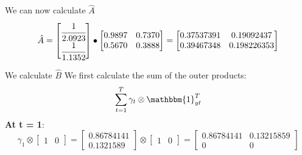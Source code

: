 We can now calculate $\hat{A}$
\[
\hat{A} = \begin{bmatrix}
    \cfrac{1}{2.0923} \\ \cfrac{1}{1.1352}
\end{bmatrix} \bullet \begin{bmatrix}
    0.9897 & 0.7370 \\ 0.5670 & 0.3888
\end{bmatrix} = \begin{bmatrix}
    0.37537391 & 0.19092437 \\ 0.39467348 & 0.198226353
\end{bmatrix}
\]

We calculate $\hat{B}$
We first calculate the sum of the outer products:
\[
\sum_{t=1}^T \gamma_t \otimes \mathbbm{1}_{yt}^T 
\]
\textbf{At t = 1}:
\[
\gamma_1 \otimes \begin{bmatrix}
    1 & 0 \end{bmatrix} = \begin{bmatrix}
        0.86784141 \\ 0.1321589    
    \end{bmatrix} \otimes \begin{bmatrix}
        1 & 0 \end{bmatrix} = \begin{bmatrix}
            0.86784141 & 0.13215859 \\
        0 & 0           
        \end{bmatrix}
\]

